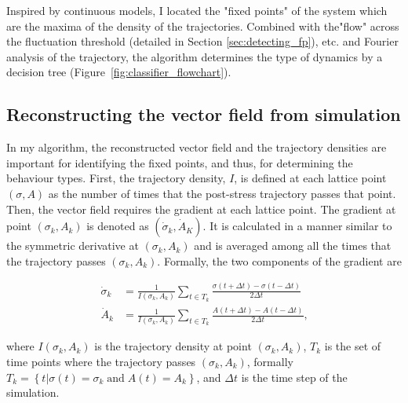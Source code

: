 Inspired by continuous models, I located the "fixed points" of the system
which are the maxima of the density of the trajectories.
Combined with the"flow" across the fluctuation threshold (detailed in Section \ref{sec:detecting_fp}), etc.
and Fourier analysis of the trajectory,
the algorithm determines the type of dynamics by a decision tree
(Figure~\ref{fig:classifier_flowchart}).

\subsection{Reconstructing the vector field from simulation}
\label{sec:reconstruction}

In my algorithm, the reconstructed vector field and the trajectory densities
are important for identifying the fixed points, and thus,
for determining the behaviour types.
%
First, the trajectory density, $I$, is defined at each lattice point 
$(\sigma, A)$ as the number of times that the post-stress trajectory passes
that point.
%
Then, the vector field requires the gradient at each lattice point.
The gradient at point $(\sigma_k, A_k)$ is denoted as 
$(\dot{\sigma}_k, \dot{A}_K)$. It is calculated in a manner similar to
the symmetric derivative at $(\sigma_k, A_k)$ and is averaged
among all the times that the trajectory passes $(\sigma_k, A_k)$.
Formally, the two components of the gradient are

\begin{align}
    \dot{\sigma}_k &= \frac{1}{I(\sigma_k, A_k)}\sum_{t \in T_k}
    \frac{\sigma(t + \Delta t) - \sigma(t - \Delta t)}{2\Delta t}\\
    \dot{A}_k &= \frac{1}{I(\sigma_k, A_k)}\sum_{t \in T_k}
    \frac{A(t + \Delta t) - A(t - \Delta t)}{2\Delta t} \text{,}
\end{align}

where $I(\sigma_k, A_k)$ is the trajectory density at point $(\sigma_k, A_k)$,
$T_k$ is the set of time points where the trajectory passes
$(\sigma_k, A_k)$, 
formally $T_k = \left\{t|\sigma(t) = \sigma_k \;\text{and}\; A(t) = A_k\right\}$,
and $\Delta t$ is the time step of the simulation.


